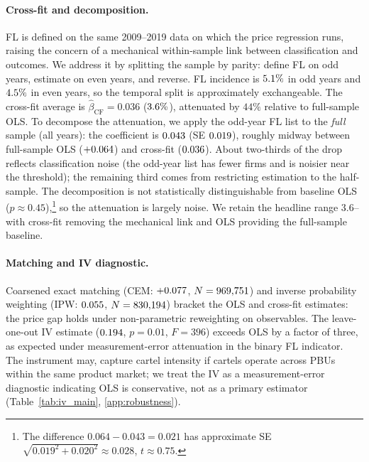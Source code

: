 \paragraph{Cross-fit and decomposition.}
FL is defined on the same 2009--2019 data on which the price
regression runs, raising the concern of a mechanical
within-sample link between classification and outcomes. We
address it by splitting the sample by parity: define FL on odd
years, estimate on even years, and reverse. FL incidence is
$5.1\%$ in odd years and $4.5\%$ in even years, so the temporal
split is approximately exchangeable. The cross-fit average is
$\hat{\beta}_{\mathrm{CF}} = 0.036$ ($3.6\%$), attenuated by $44\%$
relative to full-sample OLS. To decompose the attenuation, we
apply the odd-year FL list to the \emph{full} sample (all
years): the coefficient is $0.043$ (SE $0.019$), roughly midway
between full-sample OLS ($+0.064$) and cross-fit ($0.036$). About
two-thirds of the drop reflects classification noise (the
odd-year list has fewer firms and is noisier near the threshold);
the remaining third comes from restricting estimation to the
half-sample. The decomposition is not statistically
distinguishable from baseline OLS ($p \approx 0.45$),\footnote{The
difference $0.064 - 0.043 = 0.021$ has approximate SE
$\sqrt{0.019^2 + 0.020^2} \approx 0.028$, $t \approx 0.75$.} so
the attenuation is largely noise. We retain the headline range
3.6--\valPctSixfour with cross-fit removing the mechanical link and OLS
providing the full-sample baseline.

\paragraph{Matching and IV diagnostic.}
Coarsened exact matching (CEM: $+0.077$, $N = 969{,}751$) and
inverse probability weighting (IPW: $0.055$, $N = 830{,}194$)
bracket the OLS and cross-fit estimates: the price gap holds
under non-parametric reweighting on observables. The
leave-one-out IV estimate ($0.194$, $p = 0.01$, $F = 396$)
exceeds OLS by a factor of three, as expected under
measurement-error attenuation in the binary FL indicator. The
instrument may, capture cartel intensity if cartels
operate across PBUs within the same product market; we treat
the IV as a measurement-error diagnostic indicating OLS is
conservative, not as a primary estimator
(Table~\ref{tab:iv_main}, \ref{app:robustness}).

